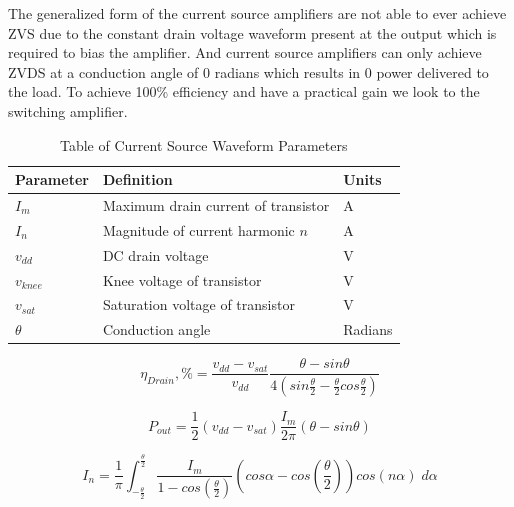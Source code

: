 The generalized form of the current source amplifiers are not able to ever achieve ZVS due to the constant drain voltage waveform present at the output which is required to bias the amplifier. And current source amplifiers can only achieve ZVDS at a conduction angle of 0 radians which results in 0 power delivered to the load. To achieve 100\% efficiency and have a practical gain we look to the switching amplifier.

\begin{table}
    \caption{Table of Current Source Waveform Parameters}
    \label{table:waveform_param}
        \begin{center}
            \begin{tabular}{|l|l|l|}
              \hline
              Parameter & Definition & Units\\ \hline
              $I_m$ & Maximum drain current of transistor & A \\ \hline
              $I_n$ & Magnitude of current harmonic $n$ & A \\ \hline
              $v_{dd}$ & DC drain voltage & V\\ \hline
              $v_{knee}$ & Knee voltage of transistor & V\\ \hline
              $v_{sat}$ & Saturation voltage of transistor & V \\ \hline
              $\theta$ & Conduction angle & Radians\\ \hline

            \end{tabular}
        \end{center}
\end{table}

\begin{equation}\label{eq:cond_eff}
  \eta_{Drain}, \% = \frac{v_{dd} - v_{sat}}{v_{dd}} \frac{\theta - sin\theta}{4(sin\frac{\theta}{2} - \frac{\theta}{2} cos\frac{\theta}{2}) }
\end{equation}

\begin{equation}\label{eq:cond_pout}
  P_{out} = \frac{1}{2}(v_{dd} - v_{sat} )\frac{I_m}{2\pi}(\theta - sin\theta)
\end{equation}

\begin{equation}\label{eq:cond_current}
  I_n = \frac{1}{\pi}\int_{-\frac{\theta}{2}}^{\frac{\theta}{2}} \frac{I_m}{1 - cos(\frac{\theta}{2})} (cos\alpha - cos(\frac{\theta}{2}))cos(n\alpha) \; d\alpha
\end{equation}


